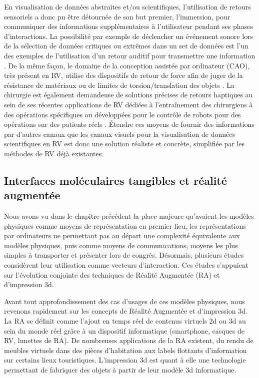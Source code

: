 En visualisation de données abstraites et/ou scientifiques, l'utilisation  de retours sensoriels a donc pu être détournée de son but premier, l'immersion, pour communiquer des informations supplémentaires à l'utilisateur pendant ses phases d'interactions. La possibilité par exemple de déclencher un événement sonore lors de la sélection de données critiques ou extrêmes dans un set de données est l'un des exemples de l'utilisation d'un retour auditif pour transmettre une information \cite{ferey_multisensory_2009}. De la même façon, le domaine de la conception assistée par ordinateur (CAO), très présent en RV, utilise des dispositifs de retour de force afin de juger de la résistance de matériaux ou de limites de torsion/translation des objets \cite{sun2010haptic}. La chirurgie est également demandeuse de solutions précises de retours haptiques au sein de ses récentes applications de RV dédiées à l’entraînement des chirurgiens à des opérations spécifiques ou développées pour le contrôle de robots pour des opérations sur des patients réels \cite{kusumoto_application_2006}. Étendre ces moyens de fournir des informations par d'autres canaux que les canaux visuels pour la visualisation de données scientifiques en RV est donc une solution réaliste et concrète, simplifiée par les méthodes de RV déjà existantes.

\subsection{Interfaces moléculaires tangibles et réalité augmentée}

Nous avons vu dans le chapitre précédent la place majeure qu'avaient les modèles physiques comme moyens de représentation en premier lieu, les représentations par ordinateurs ne permettant pas au départ une complexité équivalente aux modèles physiques, puis comme moyens de communications, moyens les plus simples à transporter et présenter lors de congrès. Désormais, plusieurs études considèrent leur utilisation comme vecteurs d'interaction. Ces études s'appuient sur l'évolution conjointe des techniques de Réalité Augmentée (RA) et d'impression 3d. 

Avant tout approfondissement des cas d'usages de ces modèles physiques, nous revenons rapidement sur les concepts de Réalité Augmentée et d'impression 3d. La RA se définit comme l'ajout en temps réel de contenus virtuels 2d ou 3d au sein du monde réel grâce à un dispositif informatique (smartphone, casques de RV, lunettes de RA). De nombreuses applications de la RA existent, du rendu de meubles virtuels dans des pièces d'habitation aux labels flottants d'information sur certains lieux touristiques. 
L'impression 3d est quant à elle une technologie permettant de fabriquer des objets à partir de leur modèle 3d informatique. 


